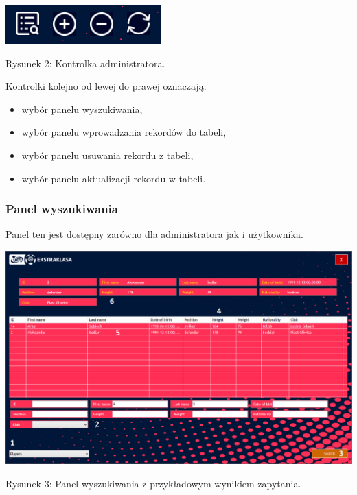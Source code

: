\documentclass[12pt,a4paper]{article}
\begin{document}
    \begin{center}
        \includegraphics[scale=1]{admin-controls.png}
        \begin{flushleft}
            \begin{scriptsize}
            \begin{list}{}{\leftmargin=19em}\raggedright\item\relax
            Rysunek 2: Kontrolka administratora.
            \end{list}
            \end{scriptsize}
        \end{flushleft}
    \end{center}
    
    Kontrolki kolejno od lewej do prawej oznaczają:
    \begin{itemize}
        \item wybór panelu wyszukiwania,
        \item wybór panelu wprowadzania rekordów do tabeli,
        \item wybór panelu usuwania rekordu z tabeli,
        \item wybór panelu aktualizacji rekordu w tabeli.
    \end{itemize}
    
    \subsubsection{Panel wyszukiwania}
    Panel ten jest dostępny zarówno dla administratora jak i użytkownika.
    \begin{center}
        \includegraphics[scale=0.47]{select-panel.png}
        \begin{flushleft}
            \begin{scriptsize}
            \begin{list}{}{\leftmargin=13.5em}\raggedright\item\relax
            Rysunek 3: Panel wyszukiwania z przykładowym wynikiem zapytania.
            \end{list}
            \end{scriptsize}
        \end{flushleft}
    \end{center}
    
\end{document}
